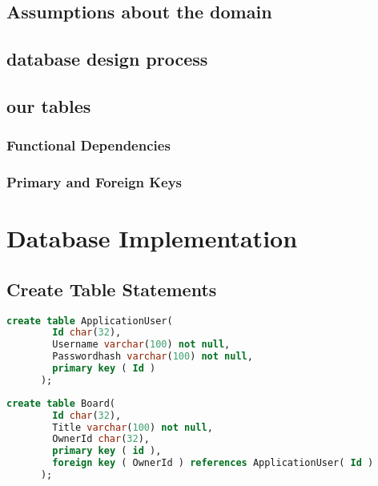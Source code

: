 \documentclass[letterpaper]{article}
\begin{document}
\subsection{Assumptions about the domain}

\subsection{database design process}

\subsection{our tables}
\subsubsection{Functional Dependencies}
\subsubsection{Primary and Foreign Keys}

\section{Database Implementation}

\subsection{Create Table Statements}
    \begin{lstlisting}[language=SQL, caption=ApplicationUser Table]
      create table ApplicationUser(
        Id char(32),
        Username varchar(100) not null,
        Passwordhash varchar(100) not null,
        primary key ( Id )
      );
    \end{lstlisting}

    \begin{lstlisting}[language=SQL, caption=Board Table]
      create table Board(
        Id char(32),
        Title varchar(100) not null,
        OwnerId char(32),
        primary key ( id ),
        foreign key ( OwnerId ) references ApplicationUser( Id )
      );
    \end{lstlisting}
\end{document}
